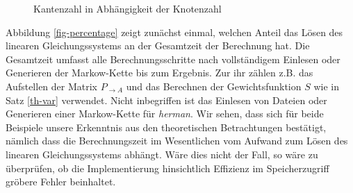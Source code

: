 \documentclass[a4paper]{article}
\newcommand{\mc}{Markow-Kette}
\theoremstyle{nonumberplain}
\begin{document}
\begin{figure}
	\caption{Kantenzahl in Abhängigkeit der Knotenzahl}
	\label{mc-size}
	\centering
\end{figure}


Abbildung \ref{fig-percentage} zeigt zunächst einmal, welchen Anteil das Lösen des linearen Gleichungssystems an der Gesamtzeit der Berechnung hat. Die Gesamtzeit umfasst alle Berechnungsschritte nach vollständigem Einlesen oder Generieren der \mc{} bis zum Ergebnis. Zur ihr zählen z.B. das Aufstellen der Matrix $P_{\rightarrow A}$ und das Berechnen der Gewichtsfunktion $S$ wie in Satz \ref{th-var} verwendet. Nicht inbegriffen ist das Einlesen von Dateien oder Generieren einer \mc{} für \textit{herman}. Wir sehen, dass sich für beide Beispiele unsere Erkenntnis aus den theoretischen Betrachtungen bestätigt, nämlich dass die Berechnungszeit im Wesentlichen vom Aufwand zum Lösen des linearen Gleichungssystems abhängt. Wäre dies nicht der Fall, so wäre zu überprüfen, ob die Implementierung hinsichtlich Effizienz im Speicherzugriff gröbere Fehler beinhaltet.

\end{document}

